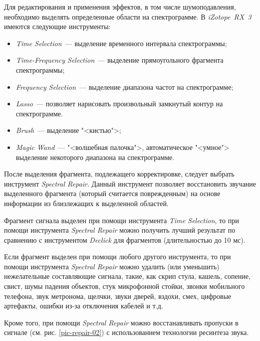 \documentclass[oneside, final, 14pt]{extreport}
\begin{document}
Для редактирования и применения эффектов, в том числе шумоподавления, необходимо выделять определенные области на спектрограмме. В \emph{iZotope~RX~3} имеются следующие инструменты:

\begin{itemize}
  \item \emph{Time Selection}~--- выделение временного интервала спектрограммы;
  \item \emph{Time-Frequency Selection}~--- выделение прямоугольного фрагмента спектрограммы;
  \item \emph{Frequency Selection}~--- выделение диапазона частот на спектрограмме;
  \item \emph{Lasso}~--- позволяет нарисовать произвольный замкнутый контур на спектрограмме.
  \item \emph{Brush}~--- выделение "<кистью">;
  \item \emph{Magic Wand}~--- "<волшебная палочка">, автоматическое "<умное"> выделение некоторого диапазона на спектрограмме.
\end{itemize}

После выделения фрагмента, подлежащего корректировке, следует выбрать инструмент \emph{Spectral Repair}. Данный инструмент позволяет восстановить звучание выделенного фрагмента (который считается поврежденным) на основе информации из близлежащих к выделенной областей.

Фрагмент сигнала выделен при помощи инструмента \emph{Time Selection}, то при помощи инструмента \emph{Spectral Repair} можно получить лучший результат по сравнению с инструментом \emph{Declick} для фрагментов (длительностью до 10 мс).

Если фрагмент выделен при помощи любого другого инструмента, то при помощи инструмента \emph{Spectral Repair} можно удалить (или уменьшить)
нежелательные составляющие сигнала, такие, как скрип стула, кашель, сопение, свист, шумы падения объектов, стук микрофонной стойки, звонки мобильного телефона, звук метронома, щелчки, звуки дверей, вздохи, смех, цифровые артефакты, ошибки из-за отключения кабелей и т.д.

Кроме того, при помощи \emph{Spectral Repair} можно восстанавливать пропуски в сигнале (см. рис. \ref{pic-repair-02}) с использованием технологии ресинтеза звука.
\end{document}
